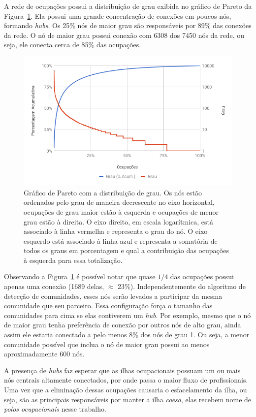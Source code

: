 \documentclass[
  article,
  11pt,
  a4paper,
  english,
  brazil,
  sumario=tradicional]{abntex2}
\begin{document}
A rede de ocupações possui a distribuição de grau exibida no gráfico de Pareto da Figura~\ref{fig:pareto-ocupacoes}. Ela possui uma grande concentração de conexões em poucos nós, formando \textit{hubs}. Os 25\% nós de maior grau são responsáveis por 89\% das conexões da rede. O nó de maior grau possui conexão com 6308 dos 7450 nós da rede, ou seja, ele conecta cerca de 85\% das ocupações.

\begin{figure}[htb]
  \centering
  \includegraphics[width=0.9\linewidth]{pareto-ocupacoes.png}
  \caption{Gráfico de Pareto com a distribuição de grau. Os nós estão ordenados pelo grau de maneira decrescente no eixo horizontal, ocupações de grau maior estão à esquerda e ocupações de menor grau estão à direita. O eixo direito, em escala logarítmica, está associado à linha vermelha e representa o grau do nó. O eixo esquerdo está associado à linha azul e representa a somatória de todos os graus em porcentagem e qual a contribuição das ocupações à esquerda para essa totalização.}
  \label{fig:pareto-ocupacoes}
\end{figure}

Observando a Figura~\ref{fig:pareto-ocupacoes} é possível notar que quase $1/4$ das ocupações possui apenas uma conexão (1689 delas, $\approx$ 23\%). Independentemente do algoritmo de detecção de comunidades, esses nós serão levados a participar da mesma comunidade que seu parceiro. Essa configuração força o tamanho das comunidades para cima se elas contiverem um \textit{hub}. Por exemplo, mesmo que o nó de maior grau tenha preferência de conexão por outros nós de alto grau, ainda assim ele estaria conectado a pelo menos 8\% dos nós de grau 1. Ou seja, a menor comunidade possível que inclua o nó de maior grau possui ao menos aproximadamente 600 nós.

A presença de \textit{hubs} faz esperar que as ilhas ocupacionais possuam um ou mais nós centrais altamente conectados, por onde passa o maior fluxo de profissionais. Uma vez que a eliminação dessas ocupações causaria o esfacelamento da ilha, ou seja, são as principais responsáveis por manter a ilha \textit{coesa}, elas recebem nome de \textit{polos ocupacionais} nesse trabalho.
\end{document}

